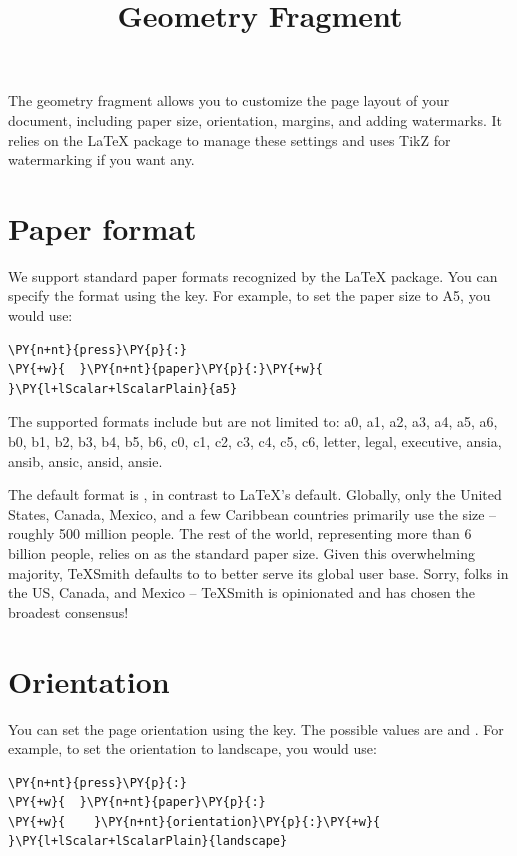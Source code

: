 \documentclass[a4paper,twoside]{article}
\title{Geometry Fragment}
\author{}\date{}
\begin{document}
\maketitle
The geometry fragment allows you to customize the page layout of your document, including paper size, orientation, margins, and adding watermarks. It relies on the \LaTeX{}  package to manage these settings and uses TikZ for watermarking if you want any.
\section{Paper format}
We support standard paper formats recognized by the \LaTeX{}  package. You can specify the format using the  key. For example, to set the paper size to A5, you would use:
\begin{tscode}[lang=yaml, engine=pygments]
\begin{Verbatim}[commandchars=\\\{\},breaklines, breakanywhere, commandchars=\\\{\}]
\PY{n+nt}{press}\PY{p}{:}
\PY{+w}{  }\PY{n+nt}{paper}\PY{p}{:}\PY{+w}{ }\PY{l+lScalar+lScalarPlain}{a5}
\end{Verbatim}
\end{tscode}
The supported formats include but are not limited to: a0, a1, a2, a3, a4, a5, a6, b0, b1, b2, b3, b4, b5, b6, c0, c1, c2, c3, c4, c5, c6, letter, legal, executive, ansia, ansib, ansic, ansid, ansie.
\begin{tscallout}[kind=note]
The default format is , in contrast to \LaTeX{}'s  default.
Globally, only the United States, Canada, Mexico, and a few Caribbean
countries primarily use the  size -- roughly 500 million people. The
rest of the world, representing more than 6 billion people, relies on 
as the standard paper size. Given this overwhelming majority, TeXSmith
defaults to  to better serve its global user base. Sorry, folks in the
US, Canada, and Mexico -- TeXSmith is opinionated and has chosen the
broadest consensus!
\end{tscallout}
\section{Orientation}
You can set the page orientation using the  key. The possible values are  and . For example, to set the orientation to landscape, you would use:
\begin{tscode}[lang=yaml, engine=pygments]
\begin{Verbatim}[commandchars=\\\{\},breaklines, breakanywhere, commandchars=\\\{\}]
\PY{n+nt}{press}\PY{p}{:}
\PY{+w}{  }\PY{n+nt}{paper}\PY{p}{:}
\PY{+w}{    }\PY{n+nt}{orientation}\PY{p}{:}\PY{+w}{ }\PY{l+lScalar+lScalarPlain}{landscape}
\end{Verbatim}
\end{tscode}
\end{document}
